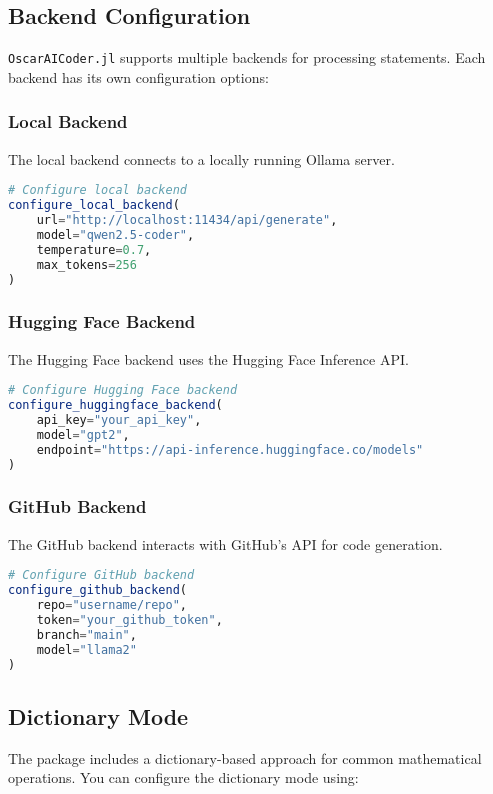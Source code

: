 \documentclass[11pt,a4paper]{article}
\newcommand{\modname}[1]{\texttt{#1}}
\begin{document}
\subsection{Backend Configuration}
\label{subsec:backend_config}

\modname{OscarAICoder.jl} supports multiple backends for processing statements. Each backend has its own configuration options:

\subsubsection{Local Backend}
The local backend connects to a locally running Ollama server.

\begin{lstlisting}[language=Julia]
# Configure local backend
configure_local_backend(
    url="http://localhost:11434/api/generate",
    model="qwen2.5-coder",
    temperature=0.7,
    max_tokens=256
)
\end{lstlisting}

\subsubsection{Hugging Face Backend}
The Hugging Face backend uses the Hugging Face Inference API.

\begin{lstlisting}[language=Julia]
# Configure Hugging Face backend
configure_huggingface_backend(
    api_key="your_api_key",
    model="gpt2",
    endpoint="https://api-inference.huggingface.co/models"
)
\end{lstlisting}

\subsubsection{GitHub Backend}
The GitHub backend interacts with GitHub's API for code generation.

\begin{lstlisting}[language=Julia]
# Configure GitHub backend
configure_github_backend(
    repo="username/repo",
    token="your_github_token",
    branch="main",
    model="llama2"
)
\end{lstlisting}

\subsection{Dictionary Mode}
\label{subsec:dictionary_mode}

The package includes a dictionary-based approach for common mathematical operations. You can configure the dictionary mode using:
\end{document}
